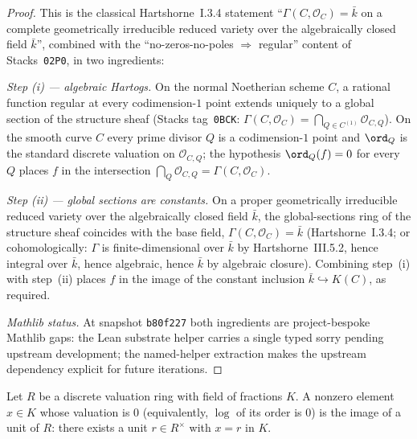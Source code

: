 \begin{proof}
  This is the classical Hartshorne~I.3.4 statement
  ``\(\Gamma(C, \mathcal O_C) = \bar k\) on a complete geometrically
  irreducible reduced variety over the algebraically closed field
  \(\bar k\)'', combined with the
  ``no-zeros-no-poles \(\Rightarrow\) regular'' content of
  Stacks~\texttt{02P0}, in two ingredients:

  \emph{Step (i) — algebraic Hartogs.} On the normal Noetherian scheme
  \(C\), a rational function regular at every codimension-\(1\) point
  extends uniquely to a global section of the structure sheaf
  (Stacks tag~\texttt{0BCK}: $\Gamma(C, \mathcal O_C) =
  \bigcap_{Q\in C^{(1)}} \mathcal O_{C, Q}$). On the smooth curve
  \(C\) every prime divisor \(Q\) is a codimension-\(1\) point and
  \(\ord_Q\) is the standard discrete valuation on
  \(\mathcal O_{C, Q}\); the hypothesis \(\ord_Q(f) = 0\) for every
  \(Q\) places \(f\) in the intersection
  \(\bigcap_Q \mathcal O_{C, Q} = \Gamma(C, \mathcal O_C)\).

  \emph{Step (ii) — global sections are constants.} On a proper
  geometrically irreducible reduced variety over the algebraically
  closed field \(\bar k\), the global-sections ring of the structure
  sheaf coincides with the base field,
  \(\Gamma(C, \mathcal O_C) = \bar k\) (Hartshorne~I.3.4; or
  cohomologically: \(\Gamma\) is finite-dimensional over \(\bar k\)
  by Hartshorne~III.5.2, hence integral over \(\bar k\), hence
  algebraic, hence \(\bar k\) by algebraic closure). Combining
  step~(i) with step~(ii) places \(f\) in the image of the constant
  inclusion \(\bar k \hookrightarrow K(C)\), as required.

  \emph{Mathlib status.} At snapshot \texttt{b80f227} both ingredients
  are project-bespoke Mathlib gaps: the Lean substrate helper carries
  a single typed sorry pending upstream development; the named-helper
  extraction makes the upstream dependency explicit for future
  iterations.
\end{proof}

\begin{lemma}
  \label{lem:lineBundleAtClosedPoint_localLift_of_log_ordFrac_eq_zero}
  Let \(R\) be a discrete valuation ring with field of fractions \(K\). A
  nonzero element \(x \in K\) whose valuation is \(0\) (equivalently,
  \(\log\) of its order is \(0\)) is the image of a unit of \(R\): there
  exists a unit \(r \in R^{\times}\) with \(x = r\) in \(K\).
\end{lemma}

